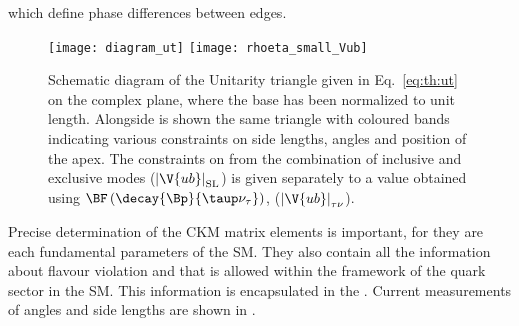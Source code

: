 which define phase differences between edges.

\begin{figure}
  \begin{center}
      \texttt{[image: diagram\_ut]}
      \texttt{[image: rhoeta\_small\_Vub]}
  \end{center}
  \caption[Unitarity triangle and current constraints]
  {
    Schematic diagram of the Unitarity triangle given in Eq.~\ref{eq:th:ut} on the complex plane,
    where the base has been normalized to unit length.
    Alongside is shown the same triangle with coloured bands indicating various constraints on
    side lengths, angles and position of the apex.
    The constraints on  from the combination of inclusive and exclusive modes
    ($\left|\V{ub}\right|_\mathrm{SL}$) is given separately to a value obtained using
    $\BF\left(\decay{\Bp}{\taup\nu_\tau}\right)$, ($\left|\V{ub}\right|_{\tau\nu}$).
  }
  \label{fig:th:ut}
\end{figure}

Precise determination of the CKM matrix elements is important, for  they are each fundamental
parameters of the SM.
They also contain all the information about flavour violation and \CPV that is allowed within the
framework of the quark sector in the SM.
This information is encapsulated in the \ut.
Current measurements of angles and side lengths are shown in .




